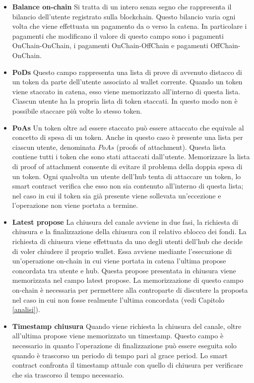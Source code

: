\documentclass[12pt,italian,]{book}
\providecommand{\tightlist}{%
  \setlength{\itemsep}{0pt}\setlength{\parskip}{0pt}}
\begin{document}
\begin{itemize}
\tightlist
\item
  \textbf{\textbf{Balance on-chain}} Si tratta di un intero senza segno che rappresenta il bilancio dell'utente registrato sulla blockchain. Questo bilancio varia ogni volta che viene effettuata un pagamento da o verso la catena. In particolare i pagamenti che modificano il valore di questo campo sono i pagamenti OnChain-OnChain, i pagamenti OnChain-OffChain e pagamenti OffChain-OnChain.
\item
  \textbf{\textbf{PoDs}} Questo campo rappresenta una lista di prove di avvenuto distacco di un token da parte dell'utente associato al wallet corrente. Quando un token viene staccato in catena, esso viene memorizzato all'interno di questa lista. Ciascun utente ha la propria lista di token staccati. In questo modo non è possibile staccare più volte lo stesso token.
\item
  \textbf{\textbf{PoAs}} Un token oltre ad essere staccato può essere attaccato che equivale al concetto di spesa di un token. Anche in questo caso è presente una lista per ciascun utente, denominata \(PoAs\) (proofs of attachment). Questa lista contiene tutti i token che sono stati attaccati dall'utente. Memorizzare la lista di proof of attachment consente di evitare il problema della doppia spesa di un token. Ogni qualvolta un utente dell'hub tenta di attaccare un token, lo smart contract verifica che esso non sia contenuto all'interno di questa lista; nel caso in cui il token sia già presente viene sollevata un'eccezione e l'operazione non viene portata a termine.
\item
  \textbf{\textbf{Latest propose}} La chiusura del canale avviene in due fasi, la richiesta di chiusura e la finalizzazione della chiusura con il relativo sblocco dei fondi. La richiesta di chiusura viene effettuata da uno degli utenti dell'hub che decide di voler chiudere il proprio wallet. Essa avviene mediante l'esecuzione di un'operazione on-chain in cui viene portata in catena l'ultima propose concordata tra utente e hub. Questa propose presentata in chiusura viene memorizzata nel campo latest propose. La memorizzazione di questo campo on-chain è necessaria per permettere alla controparte di discutere la proposta nel caso in cui non fosse realmente l'ultima concordata (vedi Capitolo \ref{analisi}).
\item
  \textbf{\textbf{Timestamp chiusura}} Quando viene richiesta la chiusura del canale, oltre all'ultima propose viene memorizzato un timestamp. Questo campo è necessario in quanto l'operazione di finalizzazione può essere eseguita solo quando è trascorso un periodo di tempo pari al grace period. Lo smart contract confronta il timestamp attuale con quello di chiusura per verificare che sia trascorso il tempo necessario.
\end{itemize}
\end{document}
